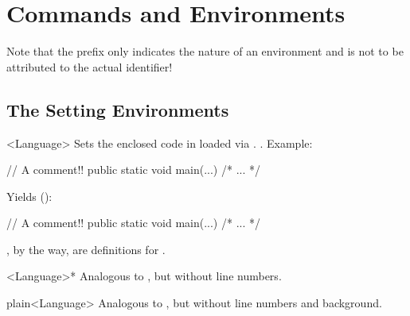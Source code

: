 \documentclass{sopra-base}
\begin{document}
\section{Commands and Environments}

Note that the prefix  only indicates the nature of an environment and is not to be attributed to the actual identifier!


\subsection{The Setting Environments}


\begin{environment}{<Language>}{}
    Sets the enclosed code in  loaded via . .
    Example:\smallskip\\ %
    \begin{latex}
\begin{java}
// A comment!!
public static void main(...){ /* ... */ }
\end{java}
    \end{latex}
    Yields ():
\begin{java}
// A comment!!
public static void main(...){ /* ... */ }
\end{java}
    , by the way, are definitions for .
\end{environment}

\begin{environment}{<Language>*}{}
    Analogous to , but without line numbers.
\end{environment}

\begin{environment}{plain<Language>}{}
    Analogous to , but without line numbers and background.
\end{environment}
\end{document}
